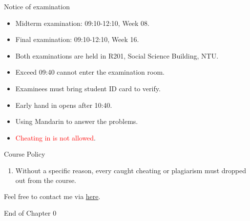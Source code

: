 \documentclass{beamer}
\begin{document}
\begin{frame}{Notice of examination}
    \begin{itemize}
    \pause
    \item Midterm examination: 09:10-12:10, Week 08.
    \pause
    \item Final examination: 09:10-12:10, Week 16.
    \pause
    \item Both examinations are held in R201, Social Science Building, NTU.
    \pause
    \item Exceed 09:40 cannot enter the examination room.
    \pause
    \item Examinees must bring student ID card to verify.
    \pause
    \item Early hand in opens after 10:40.
    \pause
    \item Using Mandarin to answer the problems.
    \pause
    \item \textcolor{red}{Cheating in is not allowed}.
    \end{itemize}
\end{frame}
\begin{frame}{Course Policy}
\begin{enumerate}
\pause
\item Without a specific reason, every caught cheating or plagiarism must dropped out from the course. \\
\end{enumerate}
\end{frame}
\begin{frame}{}
\begin{center}
\Large{Feel free to contact me via \href{mailto:politics.tchsiao@gmail.com}{here}.}
\end{center}
\end{frame}
\begin{frame}{}
\begin{center}
\Large{End of Chapter 0}
\end{center}
\end{frame}
\end{document}
